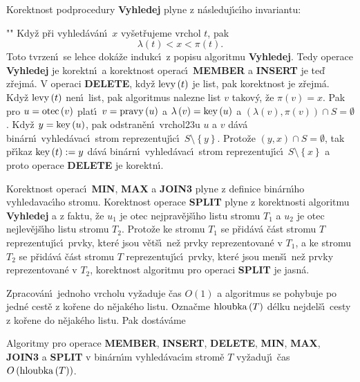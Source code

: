 \flushpar Korektnost podprocedury {\bf Vyhledej} plyne z 
n\'asleduj\'\i c\'\i ho invariantu:
\roster
\item"{}"
Kdy\v z p\v ri vyhled\'av\'an\'\i\ $x$ vy\v set\v rujeme vrchol $
t$, pak 
$$\lambda \left(t\right)<x<\pi \left(t\right).$$
\endroster
Toto tvrzen\'\i\ se lehce dok\'a\v ze indukc\'\i\ z popisu algoritmu 
{\bf Vy\-hledej}.  Tedy operace {\bf Vy\-hledej} je korektn\'\i\ a korekt\-nost 
ope\-rac\'\i\ {\bf MEMBER} a {\bf INSERT} je te\v d z\v rejm\'a. V operaci {\bf DELE\-TE},  
kdy\v z $\operatorname{levy}\left(t\right)$ je list, pak korektnost je z\v rejm\'a. Kdy\v z $\operatorname{levy}
\left(t\right)$ 
nen\'\i\ list, pak algoritmus nalezne list $v$ takov\'y, \v ze $\pi\left(v\right)=x$. 
Pak pro $u=\operatorname{otec}\left(v\right)$ plat\'\i\ $v=\operatorname{pravy}\left(u\right)$ a $\lambda\left(v\right)=\operatorname{key}\left(u\right)$ a 
$\left(\lambda\left(v\right),\pi\left(v\right)\right)\cap S=\emptyset$. Kdy\v z $y=\operatorname{key}\left(u\right)$, pak 
odstran\v en\'\i\ vrchol\accent23u $u$ a $v$ d\'av\'a bin\'arn\'\i\ vyhled\'avac\'\i\ strom reprezentuj\'\i c\'\i\ $S\setminus \left\{y\right\}$. 
Proto\v ze $\left(y,x\right)\cap S=\emptyset$, tak p\v r\'\i kaz $\operatorname{key}\left(t\right):=y$ d\'av\'a bin\'arn\'\i\ 
vyhled\'avac\'\i\ strom reprezentuj\'\i c\'\i\ $S\setminus \left\{x\right\}$ a proto operace 
{\bf DELETE} je korektn\'\i . 
\medskip

\flushpar Korektnost operac\'\i\ {\bf MIN}, {\bf MAX} a {\bf JOIN3} plyne z definice 
bin\'arn\'\i ho vyhledavac\'\i ho stromu.  Korektnost operace {\bf SPLIT }
plyne z korektnosti algoritmu {\bf Vyhledej} a z faktu, \v ze $u_
1$ je otec 
nej\-prav\v ej\v s\'\i ho listu stromu $T_1$ a $u_2$ je otec nejlev\v ej\v s\'\i ho listu stromu $T_2$.  
Proto\v ze ke stromu $T_1$ se p\v rid\'av\'a \v c\'ast stromu $T$ reprezentuj\'\i c\'\i\ 
prvky, kter\'e jsou v\v et\v s\'\i\ ne\v z prvky reprezentovan\'e v $
T_1$, a ke 
stromu $T_2$ se p\v rid\'av\'a \v c\'ast stromu $T$ reprezentuj\'\i c\'\i\ prvky, 
kter\'e jsou men\v s\'\i\ ne\v z prvky reprezentovan\'e v $T_2$, korektnost 
algoritmu pro operaci {\bf SPLIT} je jasn\'a.  
\medskip

\flushpar Zpracov\'an\'\i\ jednoho vrcholu vy\v zaduje \v cas $O\left(
1\right)$ a 
algoritmus se pohybuje po jedn\'e cest\v e z ko\v rene do 
n\v ejak\'eho listu. Ozna\v cme $\operatorname{hloubka}\left(T\right)$ d\'elku nejdel\v s\'\i\ cesty 
z ko\v rene do n\v ejak\'eho listu. Pak dost\'av\'ame
\medskip

Algoritmy pro operace {\bf MEMBER}, {\bf INSERT}, {\bf DE\-LE\-TE}, {\bf MIN}, {\bf MAX}, 
{\bf JOIN3} a {\bf SPLIT} v bin\'ar\-n\'\i m vy\-hled\'a\-va\-c\'\i m stro\-m\v e $
T$ vy\v zaduj\'\i\ 
\v cas $O\left(\operatorname{hloubka}\left(T\right)\right)$. 
\endproclaim

